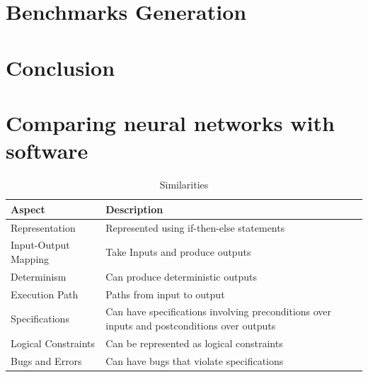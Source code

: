 \documentclass[oneside,11pt,dvipsnames]{book}
\numberwithin{equation}{section}
\theoremstyle{definition}
\theoremstyle{remark}
\begin{document}
\chapter{Benchmarks Generation}\label{chap:benchmarks-generation}




\chapter{Conclusion}

\appendix

\chapter{Comparing neural networks with software}\label{app:nn-vs-software}

\begin{table}
    \caption{Similarities}\label{tab:nn-software-similarities}
    \scriptsize
    \centering
\begin{tabular}{l|l}
    \toprule
    Aspect & Description\\
    \midrule
    Representation &	Represented using if-then-else statements\\
    Input-Output Mapping &	Take Inputs and produce outputs\\
    Determinism	& Can produce deterministic outputs\\
    Execution Path	& Paths from input to output\\
    Specifications & Can have specifications involving preconditions over inputs and postconditions over outputs\\
    Logical Constraints	& Can be represented as logical constraints\\
    Bugs and Errors & Can have bugs that violate specifications\\
    \bottomrule
\end{tabular}    
\end{table}
\end{document}
